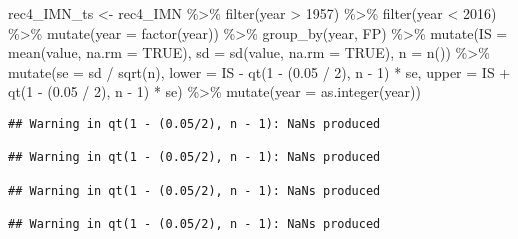 \documentclass[
]{article}
\newenvironment{Shaded}{\begin{snugshade}}{\end{snugshade}}
\newcommand{\AttributeTok}[1]{\textcolor[rgb]{0.77,0.63,0.00}{#1}}
\newcommand{\ConstantTok}[1]{\textcolor[rgb]{0.00,0.00,0.00}{#1}}
\newcommand{\DecValTok}[1]{\textcolor[rgb]{0.00,0.00,0.81}{#1}}
\newcommand{\FloatTok}[1]{\textcolor[rgb]{0.00,0.00,0.81}{#1}}
\newcommand{\FunctionTok}[1]{\textcolor[rgb]{0.00,0.00,0.00}{#1}}
\newcommand{\NormalTok}[1]{#1}
\newcommand{\OtherTok}[1]{\textcolor[rgb]{0.56,0.35,0.01}{#1}}
\newcommand{\SpecialCharTok}[1]{\textcolor[rgb]{0.00,0.00,0.00}{#1}}
\begin{document}
\begin{Shaded}
\begin{Highlighting}[]
\NormalTok{rec4\_IMN\_ts }\OtherTok{\textless{}{-}}\NormalTok{ rec4\_IMN }\SpecialCharTok{\%\textgreater{}\%} 
  \FunctionTok{filter}\NormalTok{(year }\SpecialCharTok{\textgreater{}} \DecValTok{1957}\NormalTok{) }\SpecialCharTok{\%\textgreater{}\%}
  \FunctionTok{filter}\NormalTok{(year }\SpecialCharTok{\textless{}} \DecValTok{2016}\NormalTok{) }\SpecialCharTok{\%\textgreater{}\%} 
  \FunctionTok{mutate}\NormalTok{(}\AttributeTok{year =} \FunctionTok{factor}\NormalTok{(year)) }\SpecialCharTok{\%\textgreater{}\%} 
  \FunctionTok{group\_by}\NormalTok{(year, FP) }\SpecialCharTok{\%\textgreater{}\%} 
  \FunctionTok{mutate}\NormalTok{(}\AttributeTok{IS =} \FunctionTok{mean}\NormalTok{(value, }\AttributeTok{na.rm =} \ConstantTok{TRUE}\NormalTok{), }
            \AttributeTok{sd =} \FunctionTok{sd}\NormalTok{(value, }\AttributeTok{na.rm =} \ConstantTok{TRUE}\NormalTok{),}
            \AttributeTok{n =} \FunctionTok{n}\NormalTok{()) }\SpecialCharTok{\%\textgreater{}\%} 
  \FunctionTok{mutate}\NormalTok{(}\AttributeTok{se =}\NormalTok{ sd }\SpecialCharTok{/} \FunctionTok{sqrt}\NormalTok{(n),}
         \AttributeTok{lower =}\NormalTok{ IS }\SpecialCharTok{{-}} \FunctionTok{qt}\NormalTok{(}\DecValTok{1} \SpecialCharTok{{-}}\NormalTok{ (}\FloatTok{0.05} \SpecialCharTok{/} \DecValTok{2}\NormalTok{), n }\SpecialCharTok{{-}} \DecValTok{1}\NormalTok{) }\SpecialCharTok{*}\NormalTok{ se,}
         \AttributeTok{upper =}\NormalTok{ IS }\SpecialCharTok{+} \FunctionTok{qt}\NormalTok{(}\DecValTok{1} \SpecialCharTok{{-}}\NormalTok{ (}\FloatTok{0.05} \SpecialCharTok{/} \DecValTok{2}\NormalTok{), n }\SpecialCharTok{{-}} \DecValTok{1}\NormalTok{) }\SpecialCharTok{*}\NormalTok{ se) }\SpecialCharTok{\%\textgreater{}\%} 
  \FunctionTok{mutate}\NormalTok{(}\AttributeTok{year =} \FunctionTok{as.integer}\NormalTok{(year))}
\end{Highlighting}
\end{Shaded}

\begin{verbatim}
## Warning in qt(1 - (0.05/2), n - 1): NaNs produced

## Warning in qt(1 - (0.05/2), n - 1): NaNs produced

## Warning in qt(1 - (0.05/2), n - 1): NaNs produced

## Warning in qt(1 - (0.05/2), n - 1): NaNs produced
\end{verbatim}
\end{document}
